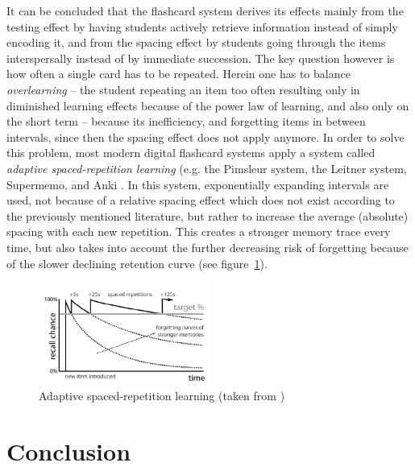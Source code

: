It can be concluded that the flashcard system derives its effects mainly from the testing effect by having students actively retrieve information instead of simply encoding it, and from the spacing effect by students going through the items interspersally instead of by immediate succession. The key question however is how often a single card has to be repeated. Herein one has to balance \emph{overlearning} -- the student repeating an item too often resulting only in diminished learning effects because of the power law of learning, and also only on the short term \cite{rohrer} -- because its inefficiency, and forgetting items in between intervals, since then the spacing effect does not apply anymore. In order to solve this problem, most modern digital flashcard systems apply a system called \emph{adaptive spaced-repetition learning} (e.g. the Pimsleur system, the Leitner system, Supermemo, and Anki \cite{microlearning}. In this system, exponentially expanding intervals are used, not because of a relative spacing effect which does not exist according to the previously mentioned literature, but rather to increase the average (absolute) spacing with each new repetition. This creates a stronger memory trace every time, but also takes into account the further decreasing risk of forgetting because of the slower declining retention curve (see figure~\ref{fig:spacedrepetition}).

\begin{figure}
    \centering
    \includegraphics[width=0.5\textwidth]{img/spacedrepetition}
    \caption{Adaptive spaced-repetition learning (taken from \protect{})}
    \label{fig:spacedrepetition}
\end{figure}

\section{Conclusion}


